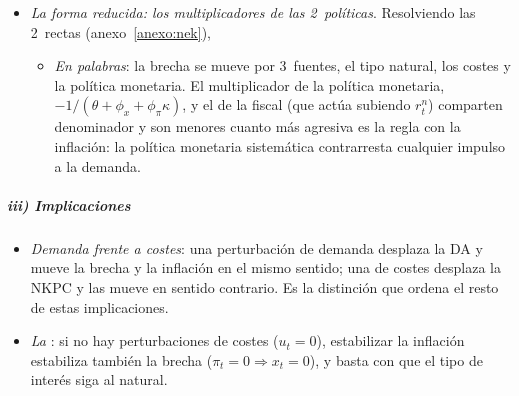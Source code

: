 \documentclass[11pt]{article}
\begin{document}
\begin{itemize}
\item \emph{La forma reducida: los multiplicadores de las 2~políticas}. Resolviendo las 2~rectas (anexo~\ref{anexo:nek}),
  \begin{itemize}
  \item \emph{En palabras}: la brecha se mueve por 3~fuentes, el tipo natural, los costes y la política monetaria. El multiplicador de la política monetaria, $-1/(\theta+\phi_x+\phi_\pi\kappa)$, y el de la fiscal (que actúa subiendo $r^n_t$) comparten denominador y son menores cuanto más agresiva es la regla con la inflación: la política monetaria sistemática contrarresta cualquier impulso a la demanda.
  \end{itemize}
\end{itemize}

\subparagraph{iii) Implicaciones}

\begin{itemize}
\item \emph{Demanda frente a costes}: una perturbación de demanda desplaza la DA y mueve la brecha y la inflación en el mismo sentido; una de costes desplaza la NKPC y las mueve en sentido contrario. Es la distinción que ordena el resto de estas implicaciones.
\item \emph{La }: si no hay perturbaciones de costes ($u_t=0$), estabilizar la inflación estabiliza también la brecha ($\pi_t=0\Rightarrow x_t=0$), y basta con que el tipo de interés siga al natural\nocite{BlanchardGali2007Real}.
\end{itemize}
\end{document}
